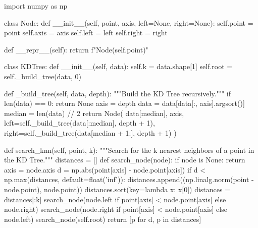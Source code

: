 import numpy as np

class Node:
    def __init__(self, point, axis, left=None, right=None):
        self.point = point
        self.axis = axis
        self.left = left
        self.right = right
    
    def __repr__(self):
        return f"Node({self.point})"

class KDTree:
    def __init__(self, data):
        self.k = data.shape[1]
        self.root = self._build_tree(data, 0)

    def _build_tree(self, data, depth):
        """Build the KD Tree recursively."""
        if len(data) == 0:
            return None
        axis = depth %
        data = data[data[:, axis].argsort()]
        median = len(data) // 2
        return Node(
            data[median],
            axis,
            left=self._build_tree(data[:median], depth + 1),
            right=self._build_tree(data[median + 1:], depth + 1)
        )

    def search_knn(self, point, k):
        """Search for the k nearest neighbors of a point in the KD Tree."""
        distances = []
        def search_node(node):
            if node is None:
                return
            axis = node.axis
            d = np.abs(point[axis] - node.point[axis])
            if d < np.max(distances, default=float('inf')):
                distances.append((np.linalg.norm(point - node.point), node.point))
                distances.sort(key=lambda x: x[0])
                distances = distances[:k]
            search_node(node.left if point[axis] < node.point[axis] else node.right)
            search_node(node.right if point[axis] < node.point[axis] else node.left)
        search_node(self.root)
        return [p for d, p in distances]
